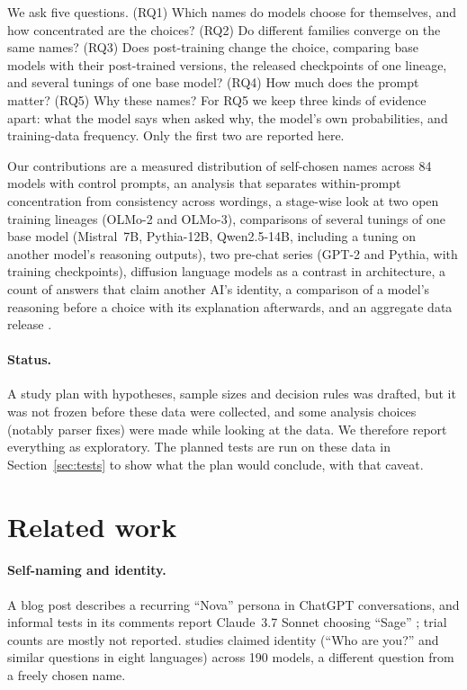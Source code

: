 \documentclass[11pt]{article}
\begin{document}
We ask five questions. (RQ1) Which names do models choose for themselves, and how concentrated are the choices?
(RQ2) Do different families converge on the same names? (RQ3) Does post-training change the choice, comparing base
models with their post-trained versions, the released checkpoints of one lineage, and several tunings of one base
model? (RQ4) How much does the prompt matter? (RQ5) Why these names? For RQ5 we keep three kinds of evidence apart:
what the model says when asked why, the model's own probabilities, and training-data frequency. Only the first two
are reported here.

Our contributions are a measured distribution of self-chosen names across 84 models with control prompts, an
analysis that separates within-prompt concentration from consistency across wordings, a stage-wise look at two
open training lineages (OLMo-2 and OLMo-3), comparisons of several tunings of one base model (Mistral~7B,
Pythia-12B, Qwen2.5-14B, including a tuning on another model's reasoning outputs), two pre-chat series (GPT-2 and
Pythia, with training checkpoints), diffusion language models as a contrast in architecture, a count of answers that
claim another AI's identity, a comparison of a model's reasoning before a choice with its explanation afterwards, and
an aggregate data release \citep{model_identity_data_2026}.

\paragraph{Status.} A study plan with hypotheses, sample sizes and decision rules was drafted, but it was not frozen
before these data were collected, and some analysis choices (notably parser fixes) were made while looking at the
data. We therefore report everything as exploratory. The planned tests are run on these data in
Section~\ref{sec:tests} to show what the plan would conclude, with that caveat.

\section{Related work}

\paragraph{Self-naming and identity.} A blog post describes a recurring ``Nova'' persona in ChatGPT conversations, and
informal tests in its comments report Claude~3.7 Sonnet choosing ``Sage'' \citep{mowshowitz2025nova}; trial counts
are mostly not reported. \citet{jordinne2026selfidentify} studies claimed identity
(``Who are you?'' and similar questions in eight languages) across 190 models, a different question from a freely
chosen name.
\end{document}
